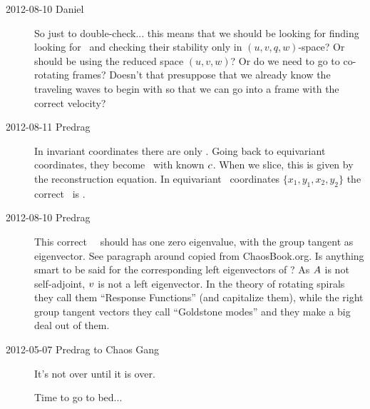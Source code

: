 \begin{description}
\item[2012-08-10 Daniel] So just to double-check... this means that
we should be looking for finding looking for \eqva\ and checking their
stability only in $(u,v,q,w)$-space? Or should be using the reduced space
$(u,v,w)$? Or do we need to go to co-rotating frames? Doesn't that presuppose
that we already know the traveling waves to begin with so that we can go
into a frame with the correct velocity?

\item[2012-08-11 Predrag] In invariant coordinates there are only \eqva.
Going back to equivariant coordinates, they become \reqva\ with known
{\phaseVel} $c$. When we slice, this is given by the reconstruction
equation. In equivariant \statesp\ coordinates $\{x_1, y_1 ,x_2, y_2\}$
the correct \stabmat\ is .

\item[2012-08-10 Predrag]                   \toCB
This correct \reqv\ \stabmat\ should has one zero eigenvalue, with the
group tangent as eigenvector. See paragraph around 
copied from ChaosBook.org. Is anything smart to be said for the
corresponding left eigenvectors of ? As $A$ is not
self-adjoint, $v$ is not a left eigenvector. In the theory of rotating
spirals they call them ``Response Functions'' (and
capitalize them), while the right group tangent vectors they call
``Goldstone modes'' and they make a big deal out of them.


\item[2012-05-07  Predrag to Chaos Gang] It's not over until it is over.

Time to go to bed...
\end{description}

